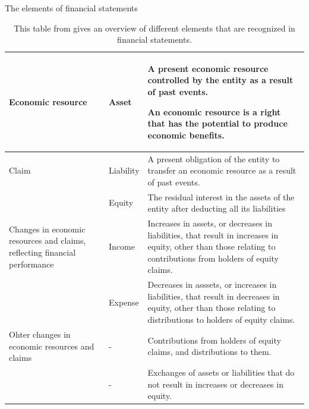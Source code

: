 



\begin{table}
	\caption{The elements of financial statements}\label{tab:elementsfinancialstatements}
	\begin{center}
	\begin{tabular}{|p{}|p{2cm}|p{}|}
	\hline
	Economic resource &
	  Asset &
	  A present economic resource controlled by the entity as a result of past events.
	  
	  An economic resource is a right that has the potential to produce economic benefits. \\ \hline
	Claim                                          & Liability & A present obligation of the entity to transfer an economic resource as a result of past events. \\ \cline{2-3} 
												   & Equity    & The residual interest in the assets of the entity after deducting all its liabilities           \\ \hline
	Changes in economic resources and claims, reflecting financial performance &
	  Income &
	  Increases in assets, or decreases in liabilities, that result in increases in equity, other than those relating to contributions from holders of equity claims. \\ \cline{2-3} 
	 &
	  Expense &
	  Decreases in asssets, or increases in liabilities, that result in decreases in equity, other than those relating to distributions to holders of equity claims. \\ \hline
	Ohter changes in economic resources and claims & -         & Contributions from holders of equity claims, and distributions to them.                         \\ \cline{2-3}
												   & -         & Exchanges of assets or liabilities that do not result in increases or decreases in equity.      \\ \hline
	\end{tabular}
	
\end{center}
	\caption*{This table from \cite[Section 4.2]{IASBFramwork} gives an overview of different elements that are recognized in financial statements.}
\end{table}








